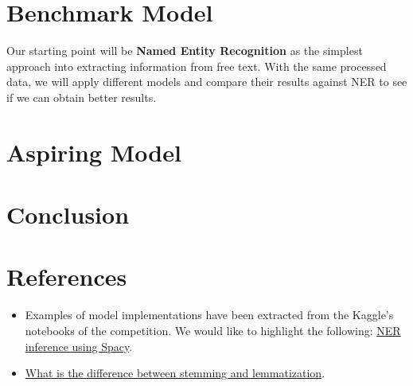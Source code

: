 \documentclass[11pt]{article}
\begin{document}
\section{Benchmark Model}

Our starting point will be \textbf{Named Entity Recognition} as the simplest approach into extracting information from free text.
With the same processed data, we will apply different models and compare their results against NER to see if we can obtain better results.

\section{Aspiring Model}

\section{Conclusion}

\section{References}

\begin{itemize}
    \item Examples of model implementations have been extracted from the Kaggle's notebooks of the competition. We would like to highlight the following: \href{https://www.kaggle.com/rohitsingh9990/ner-inference-using-spacy-lb-0-628}{NER inference using Spacy}.
    \item \href{https://blog.bitext.com/what-is-the-difference-between-stemming-and-lemmatization/}{What is the difference between stemming and lemmatization}.
\end{itemize}
\end{document}

